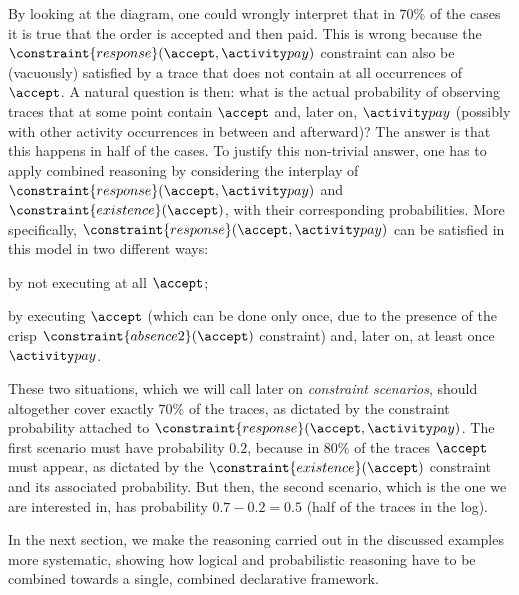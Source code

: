 \begin{example}
  By looking at the diagram, one could wrongly interpret that in $70\%$ of the cases it is true that the order is accepted and then paid. This is wrong because the $\constraint{response}(\accept,\pay)$ constraint can also be (vacuously) satisfied by a trace that does not contain at all occurrences of $\accept$. A natural question is then: what is the actual probability of observing traces that at some point contain $\accept$ and, later on, $\pay$ (possibly with other activity occurrences in between and afterward)? The answer is that this happens in half of the cases. To justify this non-trivial answer, one has to apply combined reasoning by considering the interplay of $\constraint{response}(\accept,\pay)$ and $\constraint{existence}(\accept)$, with their corresponding probabilities. More specifically, $\constraint{response}(\accept,\pay)$ can be satisfied in this model in two different ways:
  \begin{compactenum}
  \item by not executing at all $\accept$;
  \item by executing $\accept$ (which can be done only once, due to the presence of the crisp $\constraint{absence2}(\accept)$ constraint) and, later on, at least once $\pay$.
  \end{compactenum}
  These two situations, which we will call later on \emph{constraint scenarios}, should altogether cover exactly $70\%$ of the traces, as dictated by the constraint probability attached to $\constraint{response}(\accept,\pay)$. The first scenario must have probability $0.2$, because in $80\%$ of the traces $\accept$ must appear, as dictated by the $\constraint{existence}(\accept)$ constraint and its associated probability.
    But then, the second scenario, which is the one we are interested in, has probability $0.7-0.2 = 0.5$ (half of the traces in the log).
\end{example}

In the next section, we make the reasoning carried out in the discussed examples more systematic, showing how logical and probabilistic reasoning have to be combined towards a single, combined declarative framework.
